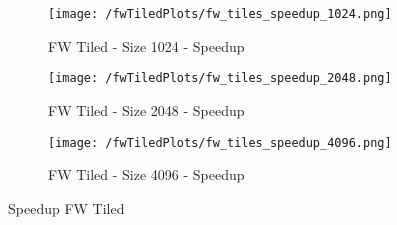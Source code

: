 \documentclass[letterpaper,12pt]{article}
\begin{document}
\begin{figure}[H]
    \centering
    \begin{subfigure}[b]{0.48\linewidth}
        \texttt{[image: /fwTiledPlots/fw\_tiles\_speedup\_1024.png]}
        \caption{FW Tiled - Size 1024 - Speedup}
    \end{subfigure}
    \begin{subfigure}[b]{0.48\linewidth}
        \texttt{[image: /fwTiledPlots/fw\_tiles\_speedup\_2048.png]}
        \caption{FW Tiled - Size 2048 - Speedup}
    \end{subfigure}
    \begin{subfigure}[b]{0.5\linewidth}
        \texttt{[image: /fwTiledPlots/fw\_tiles\_speedup\_4096.png]}
        \caption{FW Tiled - Size 4096 - Speedup}
    \end{subfigure}
    \caption{Speedup FW Tiled}
    \label{fig:Speedup FW Tiled}
\end{figure}
\end{document}
